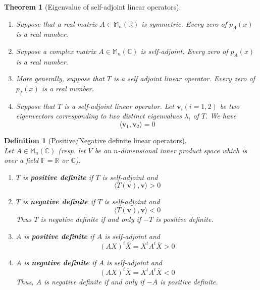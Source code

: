 \documentclass[12pt]{article}
\newtheorem{definition}{Definition}[section]
\newtheorem{theorem}{Theorem}[section]
\theoremstyle{definition}
\begin{document}
\begin{theorem}[Eigenvalue of self-adjoint linear operators]
\hfill\\\normalfont
\begin{enumerate}[label=(\arabic*)]
\item Suppose that a real matrix $A\in\mathbb{M}_n(\mathbb{R})$ is symmetric. Every zero of $p_A(x)$ is a real number.
\item Suppose a complex matrix $A\in\mathbb{M}_n(\mathbb{C})$ is self-adjoint. Every zero of $p_A(x)$ is a real number.
\item More generally, suppose that $T$ is a self adjoint linear operator. Every zero of $p_T(x)$ is a real number.
\item Suppose that $T$ is a self-adjoint linear operator. Let $\mathbf{v}_i(i=1,2)$ be two eigenvectors corresponding to two distinct eigenvalues $\lambda_i$ of $T$. We have
\[
\langle \mathbf{v}_1,\mathbf{v}_2\rangle = 0
\]
\end{enumerate}
\end{theorem}
\begin{definition}[Positive/Negative definite linear operators]
\hfill\\\normalfont Let $A\in\mathbb{M}_n(\mathbb{C})$ (resp. let $V$ be an $n$-dimensional inner product space which is over a field $\mathbb{F}=\mathbb{R}$ or $\mathbb{C}$).
\begin{enumerate}[label=(\arabic*)]
\item $T$ is \textbf{positive definite} if $T$ is self-adjoint and
\[
\langle T(\mathbf{v}),\mathbf{v}\rangle >0
\]
\item $T$ is \textbf{negative definite} if $T$ is self-adjoint and
\[
\langle T(\mathbf{v}),\mathbf{v}\rangle <0
\]
Thus $T$ is negative definite if and only if $-T$ is positive definite.
\item $A$ is \textbf{positive definite} if $A$ is self-adjoint and
\[
(AX)^t\overline{X}=X^tA^t\overline{X}>0
\]
\item $A$ is \textbf{negative definite} if $A$ is self-adjoint and
\[
(AX)^t\overline{X}=X^tA^t\overline{X}<0
\]
Thus, $A$ is negative definite if and only if $-A$ is positive definite.
\end{enumerate}
\end{definition}
\end{document}

